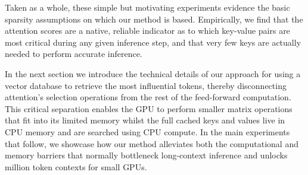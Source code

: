 Taken as a whole, these simple but motivating experiments evidence the basic sparsity assumptions on which our method is based. Empirically, we find that the attention scores are a native, reliable indicator as to which key-value pairs are most critical during any given inference step, and that very few keys are actually needed to perform accurate inference. 

In the next section we introduce the technical details of our approach for using a vector database to retrieve the \topk most influential tokens, thereby disconnecting attention's selection operations from the rest of the feed-forward computation. This critical separation enables the GPU to perform smaller matrix operations that fit into its limited memory whilst the full cached keys and values live in CPU memory and are searched using CPU compute. In the main experiments that follow, we showcase how our method alleviates both the computational and memory barriers that normally bottleneck long-context inference and unlocks million token contexts for small GPUs.

